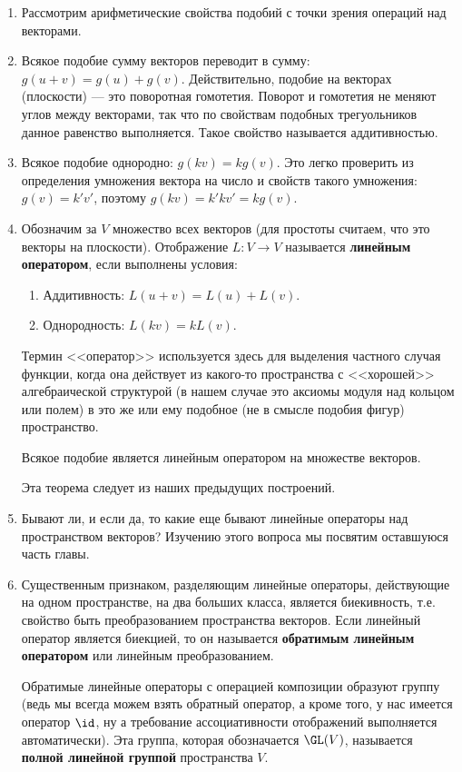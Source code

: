 \begin{enumerate}
\item Рассмотрим арифметические свойства подобий с точки зрения операций над векторами.
\item Всякое подобие сумму векторов переводит в сумму: $g(u+v)=g(u)+g(v)$. Действительно, подобие на векторах (плоскости) --- это поворотная гомотетия. Поворот и гомотетия не меняют углов между векторами, так что по свойствам подобных трегуольников данное равенство выполняется. Такое свойство называется аддитивностью.
\item Всякое подобие однородно: $g(kv)=kg(v)$. Это легко проверить из определения умножения вектора на число и свойств такого умножения: $g(v)=k'v'$, поэтому $g(kv)=k'kv'=kg(v)$.
\item Обозначим за $V$ множество всех векторов (для простоты считаем, что это векторы на плоскости). Отображение $L:V\to V$ называется \textbf{линейным оператором}, если выполнены условия:
\begin{enumerate}[{\bf Lin}1]
\item Аддитивность: $L(u+v)=L(u)+L(v)$.
\item Однородность: $L(kv)=kL(v)$.
\end{enumerate}
Термин <<оператор>> используется здесь для выделения частного случая функции, когда она действует из какого-то пространства с  <<хорошей>> алгебраической структурой (в нашем случае это аксиомы модуля над кольцом или полем) в это же или ему подобное (не в смысле подобия фигур) пространство.
\begin{thrm}
Всякое подобие является линейным оператором на множестве векторов.
\end{thrm}
Эта теорема следует из наших предыдущих построений.

\item Бывают ли, и если да, то какие еще бывают линейные операторы над пространством векторов? Изучению этого вопроса мы посвятим оставшуюся часть главы.
\item Существенным признаком, разделяющим линейные операторы, действующие на одном пространстве, на два больших класса, является биекивность, т.е. свойство быть преобразованием пространства векторов. Если линейный оператор является биекцией, то он называется \textbf{обратимым линейным оператором} или линейным преобразованием.

Обратимые линейные операторы с операцией композиции образуют группу (ведь мы всегда можем взять обратный оператор, а кроме того, у нас имеется оператор $\id$, ну а требование ассоциативности отображений выполняется автоматически). Эта группа, которая обозначается $\GL(V)$, называется \textbf{полной линейной группой} пространства $V$.


\end{enumerate}
